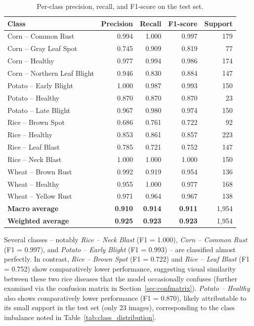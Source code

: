 \documentclass[12pt,a4paper,oneside]{report}
\begin{document}
\begin{table}[H]
\centering
\caption{Per-class precision, recall, and F1-score on the test set.}
\label{tab:per_class_metrics}
\begin{tabular}{lrrrr}
\toprule
\textbf{Class} & \textbf{Precision} & \textbf{Recall} & \textbf{F1-score} & \textbf{Support} \\
\midrule
Corn -- Common Rust          & 0.994 & 1.000 & 0.997 & 179 \\
Corn -- Gray Leaf Spot        & 0.745 & 0.909 & 0.819 & 77 \\
Corn -- Healthy               & 0.977 & 0.994 & 0.986 & 174 \\
Corn -- Northern Leaf Blight  & 0.946 & 0.830 & 0.884 & 147 \\
Potato -- Early Blight        & 1.000 & 0.987 & 0.993 & 150 \\
Potato -- Healthy             & 0.870 & 0.870 & 0.870 & 23 \\
Potato -- Late Blight         & 0.967 & 0.980 & 0.974 & 150 \\
Rice -- Brown Spot            & 0.686 & 0.761 & 0.722 & 92 \\
Rice -- Healthy               & 0.853 & 0.861 & 0.857 & 223 \\
Rice -- Leaf Blast            & 0.785 & 0.721 & 0.752 & 147 \\
Rice -- Neck Blast            & 1.000 & 1.000 & 1.000 & 150 \\
Wheat -- Brown Rust           & 0.992 & 0.919 & 0.954 & 136 \\
Wheat -- Healthy              & 0.955 & 1.000 & 0.977 & 168 \\
Wheat -- Yellow Rust          & 0.971 & 0.964 & 0.967 & 138 \\
\midrule
\textbf{Macro average}   & \textbf{0.910} & \textbf{0.914} & \textbf{0.911} & 1{,}954 \\
\textbf{Weighted average} & \textbf{0.925} & \textbf{0.923} & \textbf{0.923} & 1{,}954 \\
\bottomrule
\end{tabular}
\end{table}

Several classes -- notably \textit{Rice -- Neck Blast} (F1 = 1.000), \textit{Corn -- Common Rust} (F1 = 0.997),
and \textit{Potato -- Early Blight} (F1 = 0.993) -- are classified almost perfectly. In contrast, \textit{Rice --
Brown Spot} (F1 = 0.722) and \textit{Rice -- Leaf Blast} (F1 = 0.752) show comparatively lower performance,
suggesting visual similarity between these two rice diseases that the model occasionally confuses (further
examined via the confusion matrix in Section~\ref{sec:confmatrix}). \textit{Potato -- Healthy} also shows
comparatively lower performance (F1 = 0.870), likely attributable to its small support in the test set (only 23
images), corresponding to the class imbalance noted in Table~\ref{tab:class_distribution}.
\end{document}
